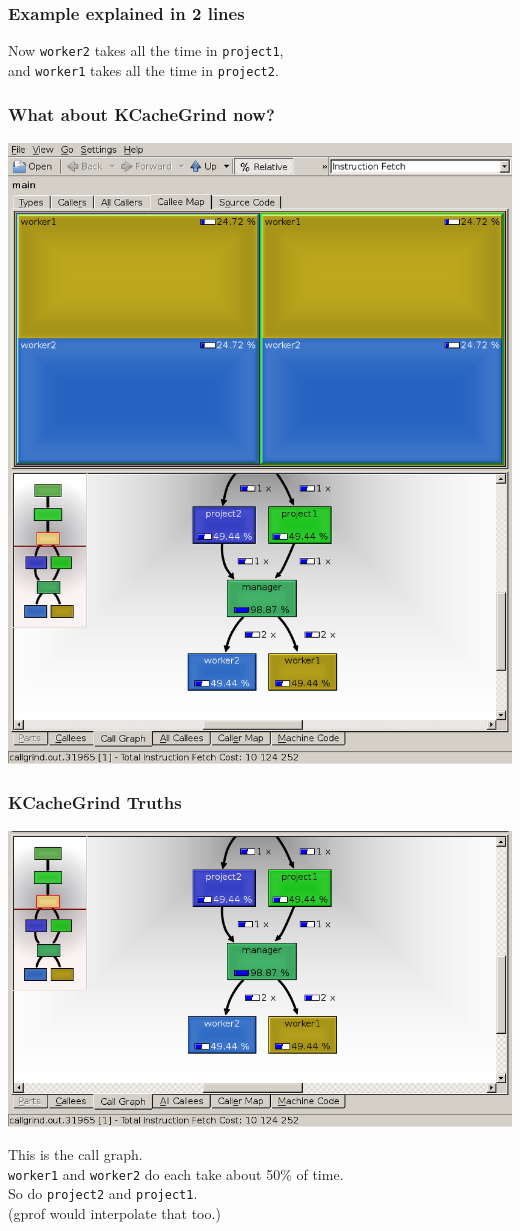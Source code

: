 \begin{frame}
  \frametitle{Example explained in 2 lines}
  
    Now {\tt worker2} takes all the time in {\tt project1},\\
    and {\tt worker1} takes all the time in {\tt project2}.
  
\end{frame}

\begin{frame}
  \frametitle{What about KCacheGrind now?}
  \begin{center}
    \includegraphics[width=.5\textwidth]{images/kcachegrind2}
  \end{center}
\end{frame}

\begin{frame}
  \frametitle{KCacheGrind Truths}
  \begin{center}
    \includegraphics[width=.5\textwidth]{images/kcachegrind2-bottom}
  \end{center}
  
    This is the call graph.\\
    {\tt worker1} and {\tt worker2} do each take about 50\% of time.\\
    So do {\tt project2} and {\tt project1}.\\[1em]
    (gprof would interpolate that too.)
  
\end{frame}

